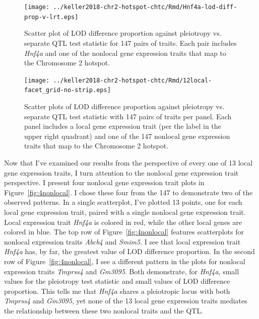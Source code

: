 \documentclass[oneside]{book}\usepackage[]{graphicx}\usepackage[]{color}
\begin{document}
\begin{figure}
    \centering
    \texttt{[image: ../keller2018-chr2-hotspot-chtc/Rmd/Hnf4a-lod-diff-prop-v-lrt.eps]}
    \caption[LOD difference proportion vs. pleiotropy test statistic.]{Scatter plot of LOD difference proportion against pleiotropy vs. 
    separate QTL test statistic for 147 pairs of traits. 
    Each pair includes \emph{Hnf4a} and one of the nonlocal gene expression traits that map to the Chromosome 2 hotspot.}
    \label{fig:hnf4a}
\end{figure}

\begin{figure}
    \centering
    \texttt{[image: ../keller2018-chr2-hotspot-chtc/Rmd/12local-facet\_grid-no-strip.eps]}
    \caption[LOD difference proportion vs. pleiotropy test statistic from the per-local gene perspective.]{Scatter plots of LOD difference proportion against pleiotropy vs. separate QTL
    test statistic with 147 pairs of traits per panel. 
    Each panel includes a local gene expression trait 
    (per the label in the upper right quadrant) and one of the 147 nonlocal gene 
    expression traits that map to the Chromosome 2 hotspot.}
    \label{fig:nothnf4a-12}
\end{figure}








Now that I've examined our results from the perspective of every one of 13 local gene expression traits,
I turn attention to the nonlocal gene expression trait perspective. 
I present four nonlocal gene expression trait plots in Figure~\ref{fig:4nonlocal}. I chose 
these four from the 147 to demonstrate two of the observed patterns. In a single scatterplot, 
I've plotted 13 points, one for each local gene expression trait, paired with a single 
nonlocal gene expression trait. Local expression trait \emph{Hnf4a} is colored in red, 
while the other local genes are colored in blue. The top row of Figure~\ref{fig:4nonlocal} 
features scatterplots for nonlocal expression traits \emph{Abcb4} and \emph{Smim5}. I see 
that local expression trait \emph{Hnf4a} has, by far, the greatest value of LOD difference 
proportion. In the second row of Figure~\ref{fig:4nonlocal}, I see a different pattern in 
the plots for nonlocal expression traits \emph{Tmprss4} and \emph{Gm3095}. Both demonstrate,
for \emph{Hnf4a}, small values for the pleiotropy test statistic and small values of LOD 
difference proportion. This tells me that \emph{Hnf4a} shares a pleiotropic locus with both 
\emph{Tmprss4} and \emph{Gm3095}, yet none of the 13 local gene expression traits mediates 
the relationship between these two nonlocal traits and the QTL.
\end{document}
